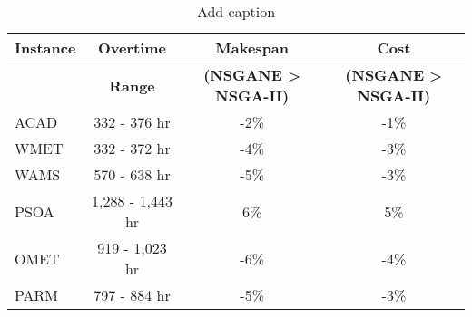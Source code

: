 \begin{table}[htbp]
  \centering
  \caption{Add caption}
    \begin{tabular}{lccc}
    \toprule
    \multirow{2}[2]{*}{\textbf{Instance}} & \textbf{Overtime } & \textbf{Makespan } & \textbf{Cost} \\
    \midrule
          & \textbf{Range} & \textbf{(NSGANE > NSGA-II)} & \textbf{(NSGANE > NSGA-II)} \\
    ACAD  & 332 - 376 hr & -2\%  & -1\% \\
    WMET  & 332 - 372 hr & -4\%  & -3\% \\
    WAMS  & 570 - 638 hr & -5\%  & -3\% \\
    PSOA  & 1,288 - 1,443 hr & 6\%   & 5\% \\
    OMET  & 919 - 1,023 hr & -6\%  & -4\% \\
    PARM  & 797 - 884 hr & -5\%  & -3\% \\
    \bottomrule
    \end{tabular}%
  \label{tab:addlabel}%
\end{table}%
